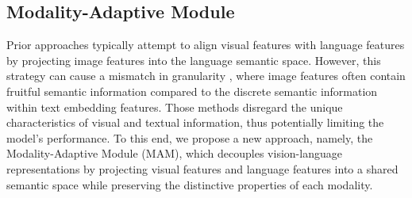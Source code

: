 \documentclass[10pt,twocolumn,letterpaper]{article}
\begin{document}
\subsection{Modality-Adaptive Module}\label{sec:module}
Prior approaches \cite{Zhu2023MiniGPT4, Liu2023Llava, Dai2023InstructBLIP, ye2023mplugowl} typically attempt to align visual features with language features by projecting image features into the language semantic space. However, this strategy can cause a mismatch in granularity , where image features often contain fruitful semantic information compared to the discrete semantic information within text embedding features. Those methods disregard the unique characteristics of visual and textual information, thus potentially limiting the model's performance. To this end, we propose a new approach, namely, the Modality-Adaptive Module (MAM), which decouples vision-language representations by projecting visual features and language features into a shared semantic space while preserving the distinctive properties of each modality. 
\end{document}
